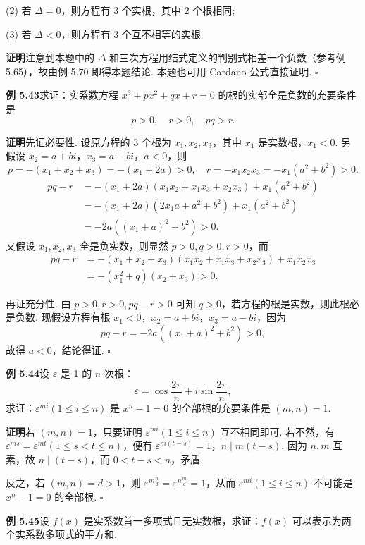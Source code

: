 \documentclass[UTF8,12pt,a4paper,fontset=fandol]{ctexart}
\begin{document}
(2) 若 $\Delta=0$，则方程有 3 个实根，其中 2 个根相同;

(3) 若 $\Delta<0$，则方程有 3 个互不相等的实根.

\noindent\textbf{证明}\quad 注意到本题中的 $\Delta$ 和三次方程用结式定义的判别式相差一个负数（参考例 5.65），故由例 5.70 即得本题结论. 本题也可用 Cardano 公式直接证明. \hfill $\square$

\noindent\textbf{例 5.43}\quad 求证：实系数方程 $x^3+px^2+qx+r=0$ 的根的实部全是负数的充要条件是
\[
p>0,\quad r>0,\quad pq>r.
\]

\noindent\textbf{证明}\quad 先证必要性. 设原方程的 3 个根为 $x_1,x_2,x_3$，其中 $x_1$ 是实数根，$x_1<0$. 另假设 $x_2=a+bi$，$x_3=a-bi$，$a<0$，则
\[
p=-(x_1+x_2+x_3)=-(x_1+2a)>0,\quad
r=-x_1x_2x_3=-x_1(a^2+b^2)>0.
\]
\[
\begin{aligned}
pq-r
&=-(x_1+2a)(x_1x_2+x_1x_3+x_2x_3)+x_1(a^2+b^2)\\
&=-(x_1+2a)(2x_1a+a^2+b^2)+x_1(a^2+b^2)\\
&=-2a((x_1+a)^2+b^2)>0.
\end{aligned}
\]
又假设 $x_1,x_2,x_3$ 全是负实数，则显然 $p>0,q>0,r>0$，而
\[
\begin{aligned}
pq-r
&=-(x_1+x_2+x_3)(x_1x_2+x_1x_3+x_2x_3)+x_1x_2x_3\\
&=-(x_1^2+q)(x_2+x_3)>0.
\end{aligned}
\]

再证充分性. 由 $p>0,r>0,pq-r>0$ 可知 $q>0$，若方程的根是实数，则此根必是负数. 现假设方程有根 $x_1<0$，$x_2=a+bi$，$x_3=a-bi$，因为
\[
pq-r=-2a((x_1+a)^2+b^2)>0,
\]
故得 $a<0$，结论得证. \hfill $\square$

\noindent\textbf{例 5.44}\quad 设 $\varepsilon$ 是 1 的 $n$ 次根：
\[
\varepsilon=\cos\frac{2\pi}{n}+i\sin\frac{2\pi}{n},
\]
求证：$\varepsilon^{mi}(1\le i\le n)$ 是 $x^n-1=0$ 的全部根的充要条件是 $(m,n)=1$.

\noindent\textbf{证明}\quad 若 $(m,n)=1$，只要证明 $\varepsilon^{mi}(1\le i\le n)$ 互不相同即可. 若不然，有 $\varepsilon^{ms}=\varepsilon^{mt}(1\le s<t\le n)$，便有 $\varepsilon^{m(t-s)}=1$，$n\mid m(t-s)$. 因为 $n,m$ 互素，故 $n\mid (t-s)$，而 $0<t-s<n$，矛盾.

反之，若 $(m,n)=d>1$，则 $\varepsilon^{m\frac{n}{d}}=\varepsilon^{n\frac{m}{d}}=1$，从而 $\varepsilon^{mi}(1\le i\le n)$ 不可能是 $x^n-1=0$ 的全部根. \hfill $\square$

\noindent\textbf{例 5.45}\quad 设 $f(x)$ 是实系数首一多项式且无实数根，求证：$f(x)$ 可以表示为两个实系数多项式的平方和.
\end{document}

